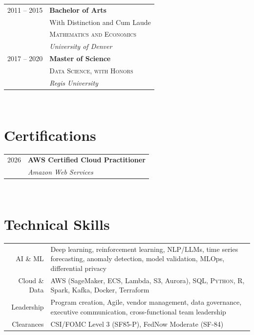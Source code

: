 \documentclass[9pt]{article} %
\begin{document}
\begin{minipage}[t]{0.40\textwidth}
\begin{tabular}{rl}

2011 -- 2015  & \textbf{Bachelor of Arts} \\ 
& \small{With Distinction and Cum Laude}\\
& \textsc{Mathematics and Economics} \\ 
& \textit{University of Denver}\\[4pt]
2017 -- 2020  & \textbf{Master of Science} \\
& \textsc{Data Science, with Honors} \\
& \textit{Regis University}\\


\end{tabular}\\[6pt]

\section{Certifications}

\begin{tabular}{rl}
2026 & \textbf{AWS Certified Cloud Practitioner}\\
     & \textit{Amazon Web Services}\\
\end{tabular}\\[6pt]

\section{Technical Skills}

\begin{tabular}{rl}
\parbox{0.3\textwidth}{AI \& ML}
& \parbox{0.5\textwidth}{\raggedright Deep learning, reinforcement learning, NLP/LLMs, time series forecasting, anomaly detection, model validation, MLOps, differential privacy}\\[3pt]
\parbox{0.3\textwidth}{Cloud \& Data}
& \parbox{0.5\textwidth}{\raggedright AWS (SageMaker, ECS, Lambda, S3, Aurora), SQL, \textsc{Python}, R, Spark, Kafka, Docker, Terraform}\\[3pt]
\parbox{0.3\textwidth}{Leadership}
& \parbox{0.5\textwidth}{\raggedright Program creation, Agile, vendor management, data governance, executive communication, cross-functional team leadership}\\[3pt]
\parbox{0.3\textwidth}{Clearances}
& \parbox{0.5\textwidth}{\raggedright CSI/FOMC Level 3 (SF85-P), FedNow Moderate (SF-84)}\\
\end{tabular}

\end{minipage} %
\end{document}

